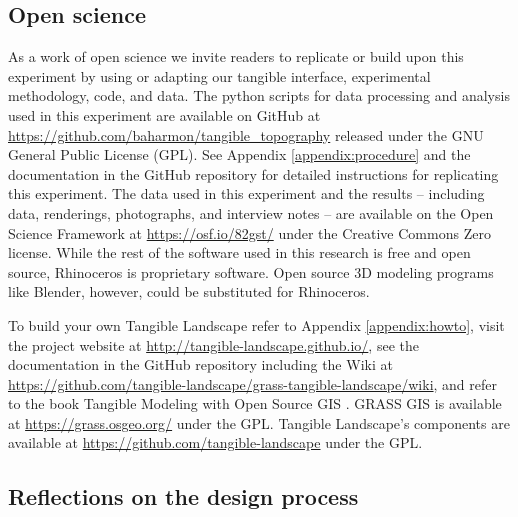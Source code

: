 \documentclass[prodmode,acmtochi]{acmsmall} %
\begin{document}

\subsection{Open science} 

% 
%

As a work of open science we invite readers to
replicate or build upon this experiment by 
using or adapting our tangible interface, experimental methodology, code, and data. 
The python scripts for data processing and analysis used in this experiment 
are available on GitHub at 
\url{https://github.com/baharmon/tangible_topography}
released under the GNU General Public License (GPL). 
See Appendix \ref{appendix:procedure}
and the documentation in the GitHub repository 
for detailed instructions for replicating this experiment. 
The data used in this experiment 
and the results -- 
including data, renderings, photographs, and interview notes --
are available on the Open Science Framework 
at \url{https://osf.io/82gst/} under the Creative Commons Zero license.
While the rest of the software used in this research is free and open source, 
Rhinoceros is proprietary software. 
Open source 3D modeling programs like 
Blender, however,
could be substituted for Rhinoceros. 

To build your own Tangible Landscape
refer to Appendix \ref{appendix:howto},
visit the project website at \url{http://tangible-landscape.github.io/}, 
see the documentation in the GitHub repository 
including the Wiki at \url{https://github.com/tangible-landscape/grass-tangible-landscape/wiki},
and refer to the book Tangible Modeling with Open Source GIS \cite{Petrasova2015}.
GRASS GIS is available at
\url{https://grass.osgeo.org/} 
under the GPL. 
Tangible Landscape's components are available at
\url{https://github.com/tangible-landscape}
under the GPL. 

\subsection{Reflections on the design process} %
\end{document}
